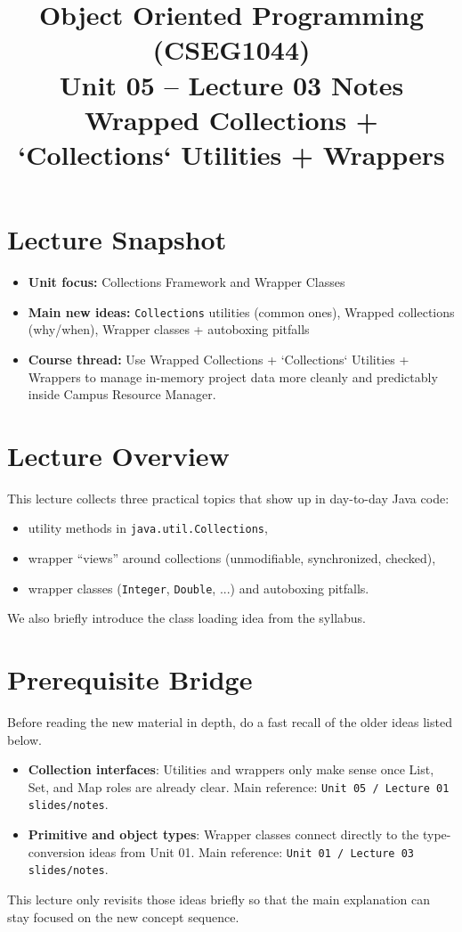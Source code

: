 \documentclass[11pt]{article}
\title{Object Oriented Programming (CSEG1044)\\Unit 05 -- Lecture 03 Notes\\Wrapped Collections + `Collections` Utilities + Wrappers}
\begin{document}
\maketitle
\tableofcontents

\section{Lecture Snapshot}
\begin{itemize}
  \item \textbf{Unit focus:} Collections Framework and Wrapper Classes
  \item \textbf{Main new ideas:} \texttt{Collections} utilities (common ones), Wrapped collections (why/when), Wrapper classes + autoboxing pitfalls
  \item \textbf{Course thread:} Use Wrapped Collections + `Collections` Utilities + Wrappers to manage in-memory project data more cleanly and predictably inside Campus Resource Manager.
\end{itemize}
\notesources{\OOPSUnitVSources}

\section{Lecture Overview}
This lecture collects three practical topics that show up in day-to-day Java code:
\begin{itemize}
  \item utility methods in \texttt{java.util.Collections},
  \item wrapper ``views'' around collections (unmodifiable, synchronized, checked),
  \item wrapper classes (\texttt{Integer}, \texttt{Double}, ...) and autoboxing pitfalls.
\end{itemize}
We also briefly introduce the class loading idea from the syllabus.
\notesources{\OOPSUnitVSources}

\section{Prerequisite Bridge}
Before reading the new material in depth, do a fast recall of the older ideas listed below.
\begin{itemize}
  \item \textbf{Collection interfaces}: Utilities and wrappers only make sense once List, Set, and Map roles are already clear. Main reference: \texttt{Unit 05 / Lecture 01 slides/notes}.
  \item \textbf{Primitive and object types}: Wrapper classes connect directly to the type-conversion ideas from Unit 01. Main reference: \texttt{Unit 01 / Lecture 03 slides/notes}.
\end{itemize}
This lecture only revisits those ideas briefly so that the main explanation can stay focused on the new concept sequence.
\notesources{\OOPSUnitVSources}
\end{document}
